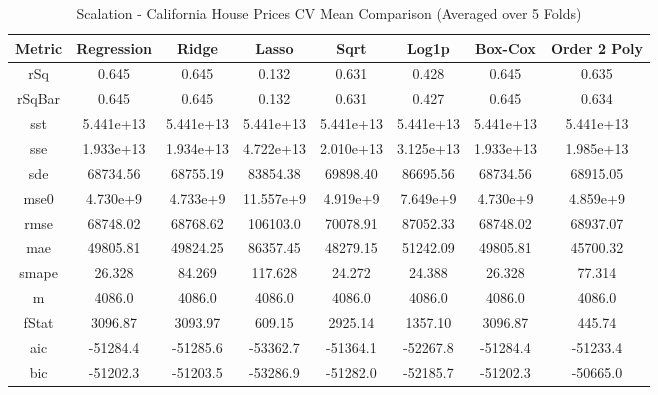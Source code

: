 \documentclass{article}
\begin{document}
\begin{table}[H]
\centering
\caption{Scalation - California House Prices CV Mean Comparison (Averaged over 5 Folds)}
\label{tab:Scalation - California House Prices CV Mean Comparison}
\begin{tabular}{|c|c|c|c|c|c|c|c|} \hline
Metric & Regression & Ridge & Lasso & Sqrt & Log1p &  Box-Cox & Order 2 Poly \\\hline \hline
rSq & 0.645 & 0.645 & 0.132 & 0.631 & 0.428 & 0.645 & 0.635 \\\hline
rSqBar & 0.645 & 0.645 & 0.132 & 0.631 & 0.427 & 0.645 & 0.634 \\\hline
sst & 5.441e+13 & 5.441e+13 & 5.441e+13 & 5.441e+13 & 5.441e+13 & 5.441e+13 & 5.441e+13 \\\hline
sse & 1.933e+13 & 1.934e+13 & 4.722e+13 & 2.010e+13 & 3.125e+13 & 1.933e+13 & 1.985e+13 \\\hline
sde & 68734.56 & 68755.19 & 83854.38 & 69898.40 & 86695.56 & 68734.56 & 68915.05 \\\hline
mse0 & 4.730e+9 & 4.733e+9 & 11.557e+9 & 4.919e+9 & 7.649e+9 & 4.730e+9 & 4.859e+9 \\\hline
rmse & 68748.02 & 68768.62 & 106103.0 & 70078.91 & 87052.33 & 68748.02 & 68937.07 \\\hline
mae & 49805.81 & 49824.25 & 86357.45 & 48279.15 & 51242.09 & 49805.81 & 45700.32 \\\hline
smape & 26.328 & 84.269 & 117.628 & 24.272 & 24.388 & 26.328 & 77.314 \\\hline
m & 4086.0 & 4086.0 & 4086.0 & 4086.0 & 4086.0 & 4086.0 & 4086.0 \\\hline
fStat & 3096.87 & 3093.97 & 609.15 & 2925.14 & 1357.10 & 3096.87 & 445.74 \\\hline
aic & -51284.4 & -51285.6 & -53362.7 & -51364.1 & -52267.8 & -51284.4 & -51233.4 \\\hline
bic & -51202.3 & -51203.5 & -53286.9 & -51282.0 & -52185.7 & -51202.3 & -50665.0 \\\hline
\end{tabular}
\end{table}
\end{document}
